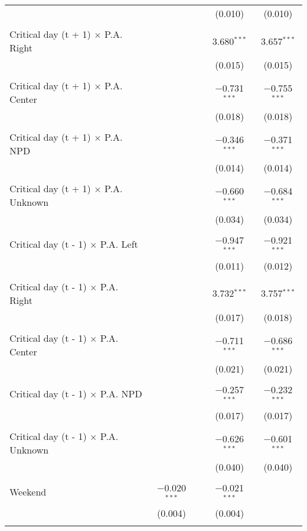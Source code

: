 \documentclass[
]{article}
\begin{document}
\begin{table}[!htbp]
{\begin{tabular}{@{\extracolsep{5pt}}lcccc}
  &  &  & (0.010) & (0.010) \\ 
  & & & & \\ 
 Critical day (t + 1) $\times$ P.A. Right &  &  & 3.680$^{***}$ & 3.657$^{***}$ \\ 
  &  &  & (0.015) & (0.015) \\ 
  & & & & \\ 
 Critical day (t + 1) $\times$ P.A. Center &  &  & $-$0.731$^{***}$ & $-$0.755$^{***}$ \\ 
  &  &  & (0.018) & (0.018) \\ 
  & & & & \\ 
 Critical day (t + 1) $\times$ P.A. NPD &  &  & $-$0.346$^{***}$ & $-$0.371$^{***}$ \\ 
  &  &  & (0.014) & (0.014) \\ 
  & & & & \\ 
 Critical day (t + 1) $\times$ P.A. Unknown &  &  & $-$0.660$^{***}$ & $-$0.684$^{***}$ \\ 
  &  &  & (0.034) & (0.034) \\ 
  & & & & \\ 
 Critical day (t - 1) $\times$ P.A. Left &  &  & $-$0.947$^{***}$ & $-$0.921$^{***}$ \\ 
  &  &  & (0.011) & (0.012) \\ 
  & & & & \\ 
 Critical day (t - 1) $\times$ P.A. Right &  &  & 3.732$^{***}$ & 3.757$^{***}$ \\ 
  &  &  & (0.017) & (0.018) \\ 
  & & & & \\ 
 Critical day (t - 1) $\times$ P.A. Center &  &  & $-$0.711$^{***}$ & $-$0.686$^{***}$ \\ 
  &  &  & (0.021) & (0.021) \\ 
  & & & & \\ 
 Critical day (t - 1) $\times$ P.A. NPD &  &  & $-$0.257$^{***}$ & $-$0.232$^{***}$ \\ 
  &  &  & (0.017) & (0.017) \\ 
  & & & & \\ 
 Critical day (t - 1) $\times$ P.A. Unknown &  &  & $-$0.626$^{***}$ & $-$0.601$^{***}$ \\ 
  &  &  & (0.040) & (0.040) \\ 
  & & & & \\ 
 Weekend & $-$0.020$^{***}$ &  & $-$0.021$^{***}$ &  \\ 
  & (0.004) &  & (0.004) &  \\ 
  & & & & \\ 

\end{tabular}}
\end{table}
\end{document}
